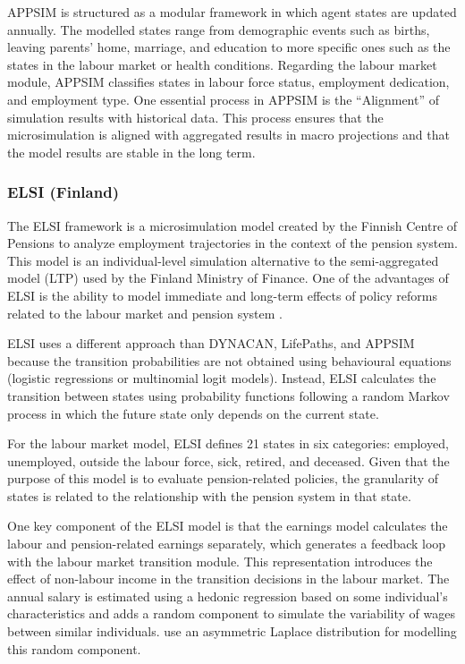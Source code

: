APPSIM is structured as a modular framework in which agent states are updated annually. The modelled states range from demographic events such as births, leaving parents' home, marriage, and education to more specific ones such as the states in the labour market or health conditions. Regarding the labour market module, APPSIM classifies states in labour force status, employment dedication, and employment type. One essential process in APPSIM is the “Alignment” of simulation results with historical data. This process ensures that the microsimulation is aligned with aggregated results in macro projections and that the model results are stable in the long term. 

\subsubsection{ELSI (Finland)} 

The ELSI framework is a microsimulation model created by the Finnish Centre of Pensions to analyze employment trajectories in the context of the pension system. This model is an individual-level simulation alternative to the semi-aggregated model (LTP) used by the Finland Ministry of Finance. One of the advantages of ELSI is the ability to model immediate and long-term effects of policy reforms related to the labour market and pension system \citep{Tika2020}. 

ELSI uses a different approach than DYNACAN, LifePaths, and APPSIM because the transition probabilities are not obtained using behavioural equations (logistic regressions or multinomial logit models). Instead, ELSI calculates the transition between states using probability functions following a random Markov process in which the future state only depends on the current state. 

For the labour market model, ELSI defines 21 states in six categories: employed, unemployed, outside the labour force, sick, retired, and deceased. Given that the purpose of this model is to evaluate pension-related policies, the granularity of states is related to the relationship with the pension system in that state. 

One key component of the ELSI model is that the earnings model calculates the labour and pension-related earnings separately, which generates a feedback loop with the labour market transition module. This representation introduces the effect of non-labour income in the transition decisions in the labour market. The annual salary is estimated using a hedonic regression based on some individual's characteristics and adds a random component to simulate the variability of wages between similar individuals. \citet{Tika2020} use an asymmetric Laplace distribution for modelling this random component. 

